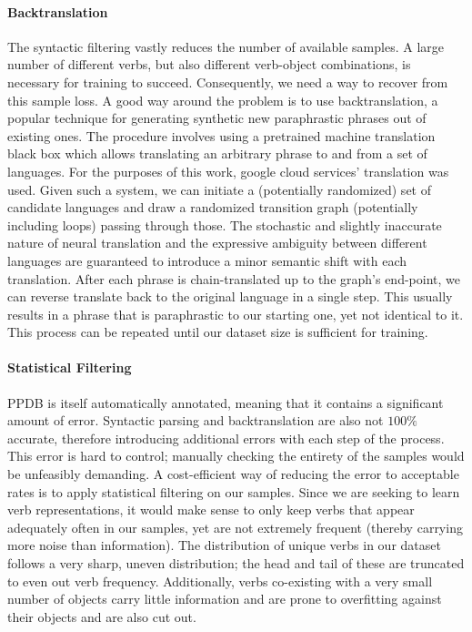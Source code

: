 \documentclass[a4paper,11pt]{article}
\begin{document}
\paragraph{Backtranslation} The syntactic filtering vastly reduces the number of available samples. A large number of different verbs, but also different verb-object combinations, is necessary for training to succeed. Consequently, we need a way to recover from this sample loss. A good way around the problem is to use backtranslation, a popular technique for generating synthetic new paraphrastic phrases out of existing ones. The procedure involves using a pretrained machine translation black box which allows translating an arbitrary phrase to and from a set of languages. For the purposes of this work, google cloud services' translation was used. Given such a system, we can initiate a (potentially randomized) set of candidate languages and draw a randomized transition graph (potentially including loops) passing through those. The stochastic and slightly inaccurate nature of neural translation and the expressive ambiguity between different languages are guaranteed to introduce a minor semantic shift with each translation. After each phrase is chain-translated up to the graph's end-point, we can reverse translate back to the original language in a single step. This usually results in a phrase that is paraphrastic to our starting one, yet not identical to it. This process can be repeated until our dataset size is sufficient for training.

\paragraph{Statistical Filtering}
PPDB is itself automatically annotated, meaning that it contains a significant amount of error. Syntactic parsing and backtranslation are also not $100\%$ accurate, therefore introducing additional errors with each step of the process. This error is hard to control; manually checking the entirety of the samples would be unfeasibly demanding. A cost-efficient way of reducing the error to acceptable rates is to apply statistical filtering on our samples. Since we are seeking to learn verb representations, it would make sense to only keep verbs that appear adequately often in our samples, yet are not extremely frequent (thereby carrying more noise than information). The distribution of unique verbs in our dataset follows a very sharp, uneven distribution; the head and tail of these are truncated to even out verb frequency. Additionally, verbs co-existing with a very small number of objects carry little information and are prone to overfitting against their objects and are also cut out.
\end{document}
